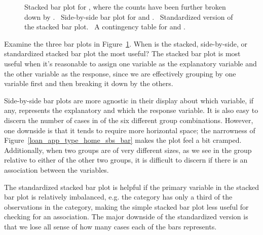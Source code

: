 \begin{figure}[h]
  \caption{ Stacked
      bar plot for ,
      where the counts have been further broken down
      by .
      ~Side-by-side
      bar plot for 
      and .
      ~Standardized
      version of the stacked bar plot.
      ~A
      contingency table for
       and .}
  \label{loan_app_type_home_seg_bar_plot}
\end{figure}

\begin{examplewrap}
\begin{nexample}{Examine the three bar plots in
    Figure~\ref{loan_app_type_home_seg_bar_plot}.
    When is the stacked, side-by-side, or standardized
    stacked bar plot the most useful?}
  The stacked bar plot is most useful when it's reasonable
  to assign one variable as the explanatory variable and
  the other variable as the response, since we are effectively
  grouping by one variable first and then breaking it down by
  the others.

  Side-by-side bar plots are more agnostic in their display
  about which variable, if any, represents the explanatory
  and which the response variable.
  It is also easy to discern the number of cases
  in of the six different group combinations.
  However, one downside
  is that it tends to require more horizontal space;
  the narrowness of Figure~\ref{loan_app_type_home_sbs_bar}
  makes the plot feel a bit cramped.
  Additionally, when two groups are of very different sizes,
  as we see in the  group relative to either of the
  other two groups,
  it is difficult to discern if there is an association
  between the variables.

  The standardized stacked bar plot is helpful if the primary
  variable in the stacked bar plot is relatively imbalanced,
  e.g. the  category has only a third of the
  observations in the  category,
  making the simple stacked bar plot less useful for
  checking for an association.
  The major downside of the standardized version
  is that we lose all sense of how many cases each of the
  bars represents.
\end{nexample}
\end{examplewrap}

